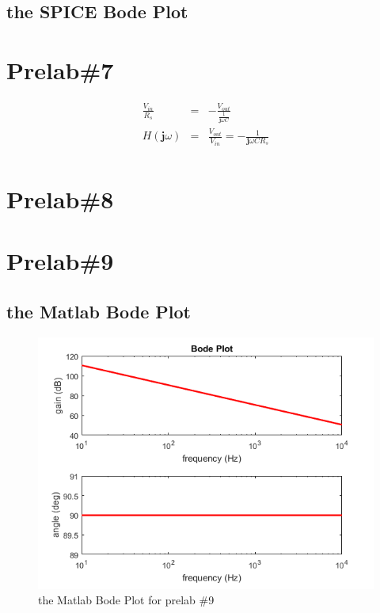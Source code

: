 \documentclass{IEEEtran}
\begin{document}
	\subsection{the SPICE Bode Plot}
	
	\section{\textbf{Prelab\#7}}
	\begin{eqnarray*}
		\frac{V_{in}}{R_s} & = & -\frac{V_{out}}{\frac{1}{\mathbf{j}\omega C}}\\
		H(\mathbf{j}\omega) & = & \frac{V_{out}}{V_{in}} = -\frac{1}{\mathbf{j}\omega CR_s}\\
	\end{eqnarray*}
	\section{\textbf{Prelab\#8}}
	
	\section{\textbf{Prelab\#9}}
	\subsection{the Matlab Bode Plot}
	\begin{figure}[!htbp]
		\centering
		\begin{framed}
			\includegraphics[width=\linewidth]{images/9.png}
			\caption{the Matlab Bode Plot for prelab \#9}
			\label{fig:901}
		\end{framed}
	\end{figure}
\end{document}
